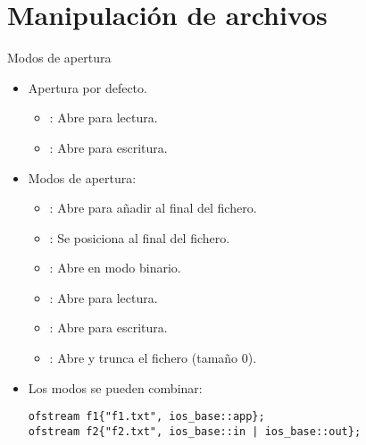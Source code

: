 \section{Manipulación de archivos}

\begin{frame}[t,fragile]{Modos de apertura}
\begin{itemize}
  \item Apertura por defecto.
    \begin{itemize}
      \item {}: Abre para lectura.
      \item {}: Abre para escritura.
    \end{itemize}

  \item Modos de apertura:
    \begin{itemize}
      \item {}: Abre para añadir al final del fichero.
      \item {}: Se posiciona al final del fichero.
      \item {}: Abre en modo binario.
      \item {}: Abre para lectura.
      \item {}: Abre para escritura.
      \item {}: Abre y trunca el fichero (tamaño 0).
    \end{itemize}

  \item Los modos se pueden combinar:
\begin{lstlisting}
ofstream f1{"f1.txt", ios_base::app};
ofstream f2{"f2.txt", ios_base::in | ios_base::out};
\end{lstlisting}
\end{itemize}
\end{frame}


